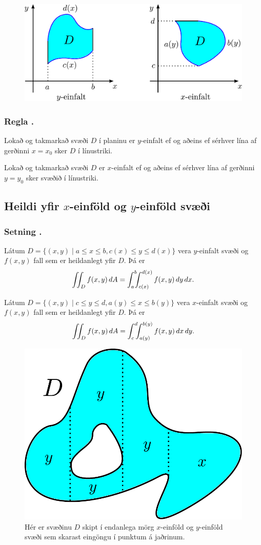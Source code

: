 \begin {figure}[h!]
 \centering
            \includegraphics[width=0.65\linewidth]{einfalt}
            \caption*{}
\end {figure}



\subsubsection{Regla \kaflanr.}
Lokað og takmarkað svæði $D$ í planinu er $y$-einfalt ef og aðeins ef sérhver lína af gerðinni $x=x_0$ sker $D$ í línustriki.  

\medskip
Lokað og takmarkað svæði $D$ er $x$-einfalt ef og aðeins ef sérhver lína af gerðinni $y=y_0$ sker svæðið í línustriki.



\subsection{Heildi yfir $x$-einföld og $y$-einföld svæði} 

\subsubsection{Setning \kaflanr.}
Látum 
$D=\{(x,y)\mid a\leq x\leq b, c(x)\leq y\leq d(x)\}$
vera $y$-einfalt svæði og $f(x,y)$ fall sem er heildanlegt yfir $D$.  Þá er 
$$\int\!\!\!\int_D f(x,y)\,dA=\int_a^b\!\!\!\int_{c(x)}^{d(x)}f(x,y)\,dy\, dx.$$


\medskip
Látum 
$D=\{(x,y)\mid c\leq y\leq d, a(y)\leq x\leq b(y)\}$
vera $x$-einfalt svæði og $f(x,y)$ fall sem er heildanlegt yfir $D$.  Þá er 
$$\int\!\!\!\int_D f(x,y)\,dA=\int_c^d\!\!\!\int_{a(y)}^{b(y)}f(x,y)\,dx\, dy.$$



 \begin {figure}[h!]
 \centering
            \includegraphics[width=0.35\linewidth]{einfalt2}
            \caption*{Hér er svæðinu $D$ skipt í endanlega mörg $x$-einföld og $y$-einföld svæði sem skarast eingöngu í punktum á jaðrinum.}
\end {figure}



